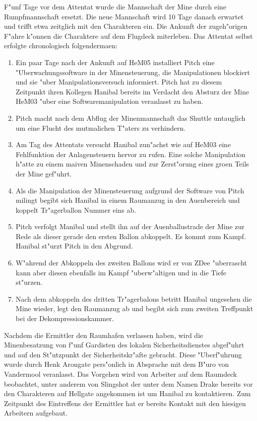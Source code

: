 
F"unf Tage vor dem Attentat wurde die Mannschaft der Mine durch eine Rumpfmannschaft ersetzt. Die neue Mannschaft wird 10 Tage danach erwartet und trifft etwa zeitglich mit den Charakteren ein. Die Ankunft der zugeh"origen F"ahre k"onnen die Charaktere auf dem Flugdeck miterleben. Das Attentat selbst erfolgte chronologisch folgenderma\3en:

\begin{enumerate}
	\item Ein paar Tage nach der Ankunft auf HeM05 installiert Pitch eine "Uberwachungssoftware in der Minensteuerung, die Manipulationen 	
		blockiert und sie "uber Manipulationsversuch informiert. Pitch hat zu diesem Zeitpunkt ihren Kollegen Hanibal bereits im Verdacht den Absturz der Mine HeM03 "uber eine Softwaremanipulation veranlasst zu haben.
	\item Pitch macht nach dem Abflug der Minenmannschaft das Shuttle untauglich um eine Flucht des mutma\3lichen T"aters zu verhindern.
	\item Am Tag des Attentats versucht Hanibal zun"achst wie auf HeM03 eine Fehlfunktion der Anlagensteuern hervor zu rufen. Eine solche 
		Manipulation h"atte zu einem ma\3iven Minenschaden und zur Zerst"orung eines gro\3en Teils der Mine gef"uhrt.
	\item Als die Manipulation der Minensteuerung aufgrund der Software von Pitch mi\3lingt begibt sich Hanibal in einem Raumanzug in den 
		Au\3enbereich und koppelt Tr"agerballon Nummer eins ab.
	\item Pitch verfolgt Manibal und stellt ihn auf der Au\3enballustrade der Mine zur Rede als dieser gerade den ersten Ballon abkoppelt. 
		Es kommt zum Kampf. Hanibal st"urzt Pitch in den Abgrund.
	\item W"ahrend der Abkoppeln des zweiten Ballons wird er von ZDee "uberrascht kann aber diesen ebenfalls im Kampf "uberw"altigen und 
		in die Tiefe st"urzen.
	\item Nach dem abkoppeln des dritten Tr"agerbalons betritt Hanibal  ungesehen die Mine wieder, legt den Raumanzug ab und begibt sich 
		zum zweiten Treffpunkt bei der Dekompressionskammer.
\end{enumerate}


Nachdem die Ermittler den Raumhafen verlassen haben, wird die Minenbesatzung von f"unf Gardisten des lokalen Sicherheitsdienstes abgef"uhrt und auf den St"utzpunkt der Sicherheitskr"afte gebracht. Diese "Uberf"uhrung wurde durch Henk Arongate pers"onlich in Absprache mit dem B"uro von Vandermool veranlasst. Das Vorgehen wird von Arbeiter auf dem Raumdeck beobachtet, unter anderem von Slingshot der unter dem Namen Drake bereits vor den Charakteren auf Hellgate angekommen ist um Hanibal zu kontaktieren. Zum Zeitpunkt des Eintreffens der Ermittler hat er bereits Kontakt mit den hiesigen Arbeitern aufgebaut. 

